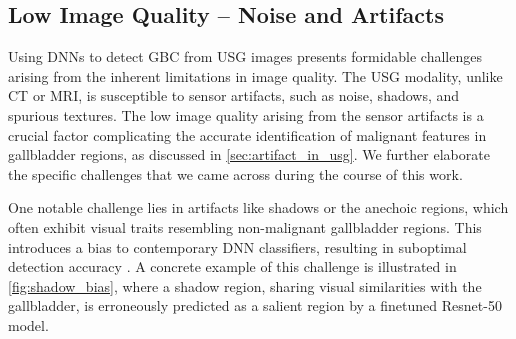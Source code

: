 \subsection{Low Image Quality -- Noise and Artifacts}
\label{sec:usg_artifact_issue}
%

Using DNNs to detect GBC from USG images presents formidable challenges arising from the inherent limitations in image quality. The USG modality, unlike CT or MRI, is susceptible to sensor artifacts, such as noise, shadows, and spurious textures. The low image quality arising from the sensor artifacts is a crucial factor complicating the accurate identification of malignant features in gallbladder regions, as discussed in \cref{sec:artifact_in_usg}. We further elaborate the specific challenges that we came across during the course of this work.

One notable challenge lies in artifacts like shadows or the anechoic regions, which often exhibit visual traits resembling non-malignant gallbladder regions. This introduces a bias to contemporary DNN classifiers, resulting in suboptimal detection accuracy \cite{basu2022surpassing}. A concrete example of this challenge is illustrated in \cref{fig:shadow_bias}, where a shadow region, sharing visual similarities with the gallbladder, is erroneously predicted as a salient region by a finetuned Resnet-50 model. 


